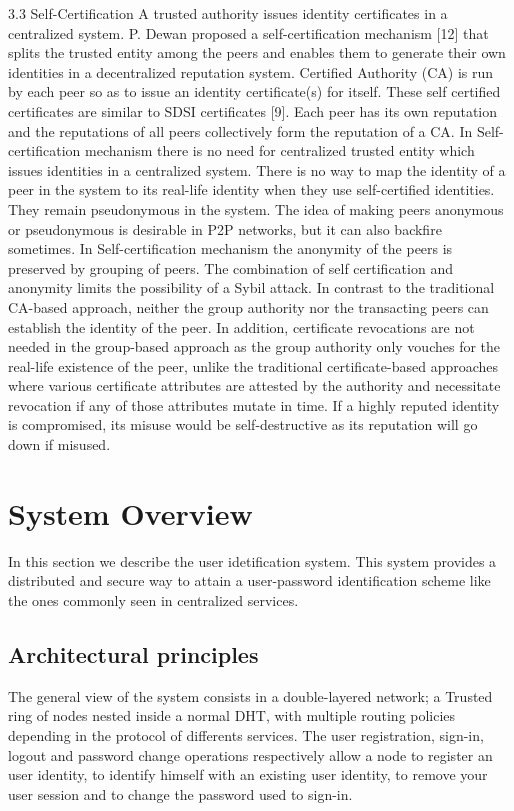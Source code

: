  
3.3 Self-Certification
A trusted authority issues identity certificates in a
centralized system. P. Dewan proposed a self-certification
mechanism [12] that splits the trusted entity among the
peers and enables them to generate their own identities in a
decentralized reputation system. Certified Authority (CA)
is run by each peer so as to issue an identity certificate(s)
for itself. These self certified certificates are similar to
SDSI certificates [9]. Each peer has its own reputation and
the reputations of all peers collectively form the reputation
of a CA.
In Self-certification mechanism there is no need for
centralized trusted entity which issues identities in a
centralized system. There is no way to map the identity of
a peer in the system to its real-life identity when they use
self-certified identities. They remain pseudonymous in the
system. The idea of making peers anonymous or
pseudonymous is desirable in P2P networks, but it can also
backfire sometimes.
In Self-certification mechanism the anonymity of the peers
is preserved by grouping of peers. The combination of self
certification and anonymity limits the possibility of a Sybil
attack. In contrast to the traditional CA-based approach,
neither the group authority nor the transacting peers can
establish the identity of the peer. In addition, certificate
revocations are not needed in the group-based approach as
the group authority only vouches for the real-life existence
of the peer, unlike the traditional certificate-based
approaches where various certificate attributes are attested
by the authority and necessitate revocation if any of those
attributes mutate in time. If a highly reputed identity is
compromised, its misuse would be self-destructive as its
reputation will go down if misused.

\chapter{System Overview}

In this section we describe the user idetification system. 
This system provides a distributed and secure way to attain a user-password
identification scheme like the ones commonly seen in centralized services.

\section{Architectural principles}
The general view of the system consists in a double-layered network; a Trusted
ring of nodes nested inside a normal DHT, with multiple routing policies
depending in the protocol of differents services. The user registration,
sign-in, logout and password change operations respectively allow a node to
register an user identity, to identify himself with an existing user identity,
to remove your user session and to change the password used to sign-in.

